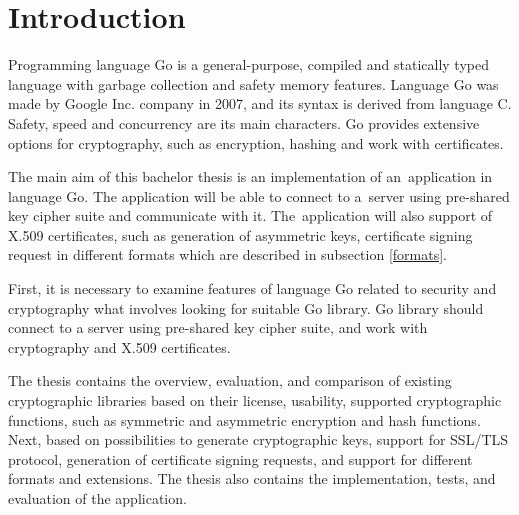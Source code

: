 \documentclass[
  12pt, 
  digital, %
  notable,   %
  nolof,     %
  nolot,     %
]{fithesis3}
\begin{document}
\chapter{Introduction}

Programming language Go is a general-purpose, compiled and statically typed language with garbage 
collection and safety memory features. Language Go was made by Google Inc. company in 2007, and its 
syntax is derived from language C. Safety, speed and concurrency are its main characters. Go 
provides extensive options for cryptography, such as encryption, hashing and work with 
certificates. 

The main aim of this bachelor thesis is an implementation of an~application in language Go. The 
application will be able to connect to a~server using pre-shared key cipher suite and communicate with 
it. The~application will also support of X.509 certificates, such as generation of asymmetric keys, certificate signing request in different formats which are described in subsection \ref{formats}. 

First, it is necessary to examine features of language Go related to security and cryptography what 
involves looking for suitable Go library. Go library should connect to a server using pre-shared key 
cipher suite, and work with cryptography and X.509 certificates. 

The thesis contains the overview, evaluation, and comparison of existing cryptographic libraries based 
on their license, usability, supported cryptographic functions, such as symmetric and asymmetric 
encryption and hash functions. Next, based on possibilities to generate cryptographic keys, support for 
SSL/TLS protocol, generation of certificate signing requests, and support for different formats and 
extensions. The thesis also contains the implementation, tests, and evaluation of the application.
\end{document}
